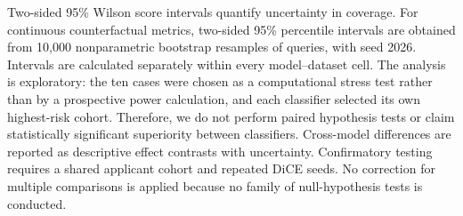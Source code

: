 \documentclass[conference]{IEEEtran}
\begin{document}
Two-sided 95\% Wilson score intervals quantify uncertainty in coverage. For continuous counterfactual metrics, two-sided 95\% percentile intervals are obtained from 10,000 nonparametric bootstrap resamples of queries, with seed 2026. Intervals are calculated separately within every model--dataset cell. The analysis is exploratory: the ten cases were chosen as a computational stress test rather than by a prospective power calculation, and each classifier selected its own highest-risk cohort. Therefore, we do not perform paired hypothesis tests or claim statistically significant superiority between classifiers. Cross-model differences are reported as descriptive effect contrasts with uncertainty. Confirmatory testing requires a shared applicant cohort and repeated DiCE seeds. No correction for multiple comparisons is applied because no family of null-hypothesis tests is conducted.
\end{document}
